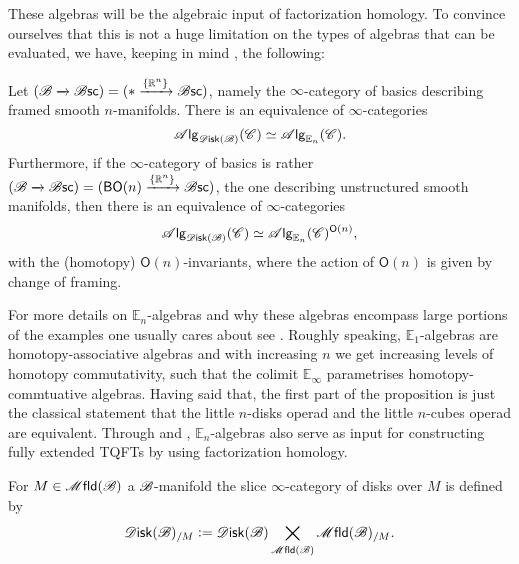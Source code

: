 \documentclass[../text]{subfiles}
\begin{document}
These algebras will be the algebraic input of factorization homology. To convince ourselves that this is not a huge limitation on the types of algebras that can be evaluated, we have, keeping in mind , the following:
%
\begin{proposition}\label{prop:framed_ndisk=En}
    Let $(\mathscr{B} \xrightarrow{} \mathscr{B} \mathsf{sc}) = (* \xrightarrow{\{ \mathbb{R}^n\}} \mathscr{B} \mathsf{sc})$, namely the $\infty$-category of basics describing framed smooth $n$-manifolds. There is an equivalence of $\infty$-categories
    \begin{equation}
        \alg{\disk(\bstr)} (\catC) \simeq \alg{\mathbb{E}_n} (\catC).
    \end{equation}
    Furthermore, if the $\infty$-category of basics is rather $(\mathscr{B} \xrightarrow{} \mathscr{B} \mathsf{sc}) = (\mathsf{BO}(n) \xrightarrow{\{ \mathbb{R}^n\}} \mathscr{B} \mathsf{sc})$, the one describing unstructured smooth manifolds, then there is an equivalence of $\infty$-categories
    \begin{equation}
        \alg{\disk(\bstr)} (\catC) \simeq \alg{\mathbb{E}_n}(\catC)^{\mathsf{O}(n)},
    \end{equation}
    with the (homotopy) $\mathsf{O}(n)$-invariants, where the action of $\mathsf{O}(n)$ is given by change of framing.
\end{proposition}

\begin{remark}
    For more details on $\mathbb{E}_n$-algebras and why these algebras encompass large portions of the examples one usually cares about see \cite[§5.1]{lurie_ha}. %
    Roughly speaking, $\mathbb{E}_1$-algebras are homotopy-associative algebras and with increasing $n$ we get increasing levels of homotopy commutativity, such that the colimit $\mathbb{E}_\infty$ parametrises homotopy-commtuative algebras. Having said that, the first part of the proposition is just the classical statement that the little $n$-disks operad and the little $n$-cubes operad are equivalent. Through \cite{lurie_tqft} and \cite{scheimbauer2014}, $\mathbb{E}_n$-algebras also serve as input for constructing fully extended TQFTs by using factorization homology.
\end{remark}


\begin{definition}
    For $M \in \mfld(\bstr)$ a $\mathscr{B}$-manifold the slice $\infty$-category of disks over $M$ is defined by
    \begin{equation}
        \disk(\bstr)_{/M} := \disk(\bstr) \bigtimes\limits_{\mfld(\bstr)} \mfld(\bstr)_{/M}.
    \end{equation}
\end{definition}
\end{document}
